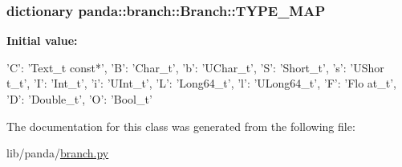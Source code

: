 \label{classpanda_1_1branch_1_1Branch_ab21c2e370b20331cea672950a44a817a}
\hypertarget{classpanda_1_1branch_1_1Branch_a1a5bfd423921d0f94dbbafbb6922399f}{
\subsubsection[{name}]{}}
\label{classpanda_1_1branch_1_1Branch_a1a5bfd423921d0f94dbbafbb6922399f}
\hypertarget{classpanda_1_1branch_1_1Branch_a7af3eb89029c8d8f1a0c649215ae6496}{
\subsubsection[{type}]{}}
\label{classpanda_1_1branch_1_1Branch_a7af3eb89029c8d8f1a0c649215ae6496}
\hypertarget{classpanda_1_1branch_1_1Branch_a2d148907b0fce8793730bbe913bb6491}{
\subsubsection[{TYPE\_\-MAP}]{\setlength{\rightskip}{0pt plus 5cm}dictionary {\bf panda::branch::Branch::TYPE\_\-MAP}}}
\label{classpanda_1_1branch_1_1Branch_a2d148907b0fce8793730bbe913bb6491}
{\bfseries Initial value:}
\begin{DoxyCode}
{'C': 'Text_t const*', 'B': 'Char_t', 'b': 'UChar_t', 'S': 'Short_t', 's': 'UShor
      t_t',
        'I': 'Int_t', 'i': 'UInt_t', 'L': 'Long64_t', 'l': 'ULong64_t', 'F': 'Flo
      at_t', 'D': 'Double_t', 'O': 'Bool_t'}
\end{DoxyCode}


The documentation for this class was generated from the following file:\begin{DoxyCompactItemize}
\item 
lib/panda/\hyperlink{branch_8py}{branch.py}\end{DoxyCompactItemize}

